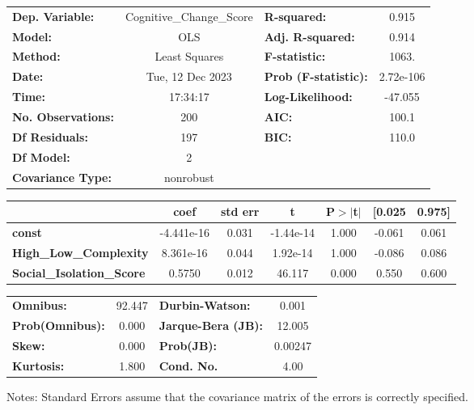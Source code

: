 \begin{center}
\begin{tabular}{lclc}
\toprule
\textbf{Dep. Variable:}           & Cognitive\_Change\_Score & \textbf{  R-squared:         } &     0.915   \\
\textbf{Model:}                   &           OLS            & \textbf{  Adj. R-squared:    } &     0.914   \\
\textbf{Method:}                  &      Least Squares       & \textbf{  F-statistic:       } &     1063.   \\
\textbf{Date:}                    &     Tue, 12 Dec 2023     & \textbf{  Prob (F-statistic):} & 2.72e-106   \\
\textbf{Time:}                    &         17:34:17         & \textbf{  Log-Likelihood:    } &   -47.055   \\
\textbf{No. Observations:}        &             200          & \textbf{  AIC:               } &     100.1   \\
\textbf{Df Residuals:}            &             197          & \textbf{  BIC:               } &     110.0   \\
\textbf{Df Model:}                &               2          & \textbf{                     } &             \\
\textbf{Covariance Type:}         &        nonrobust         & \textbf{                     } &             \\
\bottomrule
\end{tabular}
\begin{tabular}{lcccccc}
                                  & \textbf{coef} & \textbf{std err} & \textbf{t} & \textbf{P$> |$t$|$} & \textbf{[0.025} & \textbf{0.975]}  \\
\midrule
\textbf{const}                    &   -4.441e-16  &        0.031     & -1.44e-14  &         1.000        &       -0.061    &        0.061     \\
\textbf{High\_Low\_Complexity}    &    8.361e-16  &        0.044     &  1.92e-14  &         1.000        &       -0.086    &        0.086     \\
\textbf{Social\_Isolation\_Score} &       0.5750  &        0.012     &    46.117  &         0.000        &        0.550    &        0.600     \\
\bottomrule
\end{tabular}
\begin{tabular}{lclc}
\textbf{Omnibus:}       & 92.447 & \textbf{  Durbin-Watson:     } &    0.001  \\
\textbf{Prob(Omnibus):} &  0.000 & \textbf{  Jarque-Bera (JB):  } &   12.005  \\
\textbf{Skew:}          &  0.000 & \textbf{  Prob(JB):          } &  0.00247  \\
\textbf{Kurtosis:}      &  1.800 & \textbf{  Cond. No.          } &     4.00  \\
\bottomrule
\end{tabular}
\end{center}

Notes: \newline
 [1] Standard Errors assume that the covariance matrix of the errors is correctly specified.
